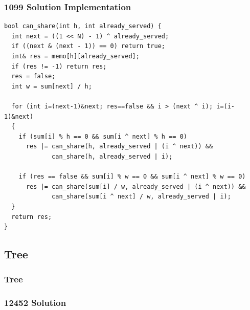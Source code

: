 \documentclass{beamer}
\newcommand{\uvalink}[2]{UVa Online Judge (http://uva.onlinejudge.org)
  problem number \href{#2}{\textcolor{blue}{#1}.}}
\newcounter{exo}
\newcommand{\exo}{
  \addtocounter{exo}{1}
  Exercice \arabic{exo}
}
\begin{document}
\begin{frame}[fragile]
\frametitle{1099 Solution Implementation}

\scriptsize
\begin{lstlisting}
bool can_share(int h, int already_served) {
  int next = ((1 << N) - 1) ^ already_served;
  if ((next & (next - 1)) == 0) return true;
  int& res = memo[h][already_served];
  if (res != -1) return res;
  res = false;
  int w = sum[next] / h;

  for (int i=(next-1)&next; res==false && i > (next ^ i); i=(i-1)&next)
  {
    if (sum[i] % h == 0 && sum[i ^ next] % h == 0)
      res |= can_share(h, already_served | (i ^ next)) &&
             can_share(h, already_served | i);

    if (res == false && sum[i] % w == 0 && sum[i ^ next] % w == 0)
      res |= can_share(sum[i] / w, already_served | (i ^ next)) &&
             can_share(sum[i ^ next] / w, already_served | i);
  }
  return res;
}
\end{lstlisting}

\end{frame}

\fi



\subsection{Tree}

\begin{frame}%
\frametitle{Tree}

\end{frame}


\ifanswers

\begin{frame}%
\frametitle{12452 Solution}

\end{frame}
\end{document}
